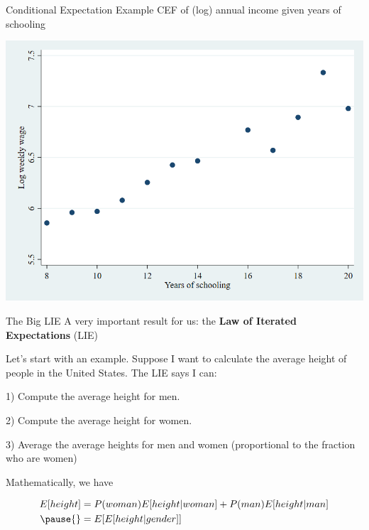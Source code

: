 \documentclass[11pt,english,handout]{beamer}
\begin{document}
\begin{frame}{Conditional Expectation Example}
	\vspace{0.2cm}
	CEF of (log) annual income given years of schooling
	
	\begin{center}
		\includegraphics[scale=1.3]{stata2pre.png}
	\end{center}
	
\end{frame}

\begin{frame}{The Big LIE}
A very important result for us: the \textbf{Law of Iterated Expectations} (LIE)
\vspace{0.2cm}

Let's start with an example. Suppose I want to calculate the average height of people in the United States. The LIE says I can:  \vspace{0.2cm}

1) Compute the average height for men. \\ \vspace{0.2cm}

2) Compute the average height for women. \\ \vspace{0.2cm}

3) Average the average heights for men and women (proportional to the fraction who are women)

\vspace{0.2cm}
\pause
Mathematically, we have 

\begin{align*}
E[height] &= P(woman) E[height | woman] + P(man) E[height|man] \\ \pause{}
& =  E[ E[height | gender ]  ]	
\end{align*}
 



\end{frame}
\end{document}
